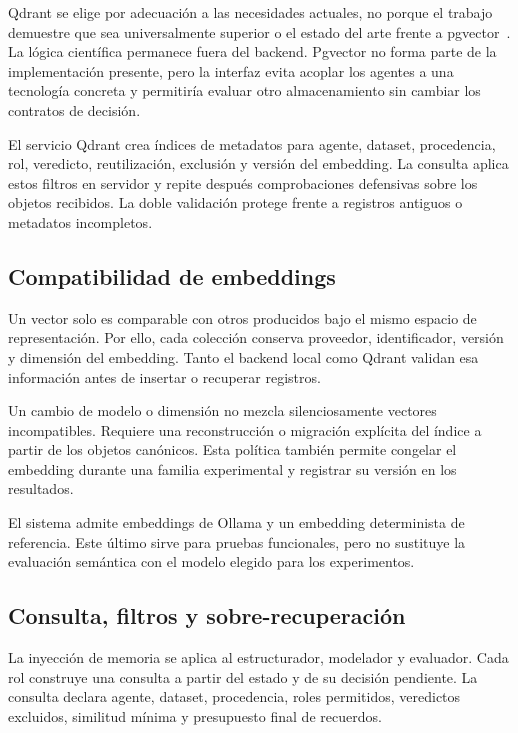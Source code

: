 Qdrant se elige por adecuación a las necesidades actuales, no porque el trabajo
demuestre que sea universalmente superior o el estado del arte frente a
pgvector~\cite{qdrant_indexing_documentation,pgvector_documentation}. La lógica
científica permanece fuera del backend. Pgvector no forma
parte de la implementación presente, pero la interfaz evita acoplar los agentes
a una tecnología concreta y permitiría evaluar otro almacenamiento sin cambiar
los contratos de decisión.

El servicio Qdrant crea índices de metadatos para agente, dataset, procedencia,
rol, veredicto, reutilización, exclusión y versión del embedding. La consulta
aplica estos filtros en servidor y repite después comprobaciones defensivas
sobre los objetos recibidos. La doble validación protege frente a registros
antiguos o metadatos incompletos.

\subsection{Compatibilidad de embeddings}

Un vector solo es comparable con otros producidos bajo el mismo espacio de
representación. Por ello, cada colección conserva proveedor, identificador,
versión y dimensión del embedding. Tanto el backend local como Qdrant validan
esa información antes de insertar o recuperar registros.

Un cambio de modelo o dimensión no mezcla silenciosamente vectores
incompatibles. Requiere una reconstrucción o migración explícita del índice a
partir de los objetos canónicos. Esta política también permite congelar el
embedding durante una familia experimental y registrar su versión en los
resultados.

El sistema admite embeddings de Ollama y un embedding determinista de
referencia. Este último sirve para pruebas funcionales, pero no sustituye la
evaluación semántica con el modelo elegido para los experimentos.

\subsection{Consulta, filtros y sobre-recuperación}

La inyección de memoria se aplica al estructurador, modelador y evaluador. Cada
rol construye una consulta a partir del estado y de su
decisión pendiente. La consulta declara agente, dataset, procedencia, roles
permitidos, veredictos excluidos, similitud mínima y presupuesto final de
recuerdos.


